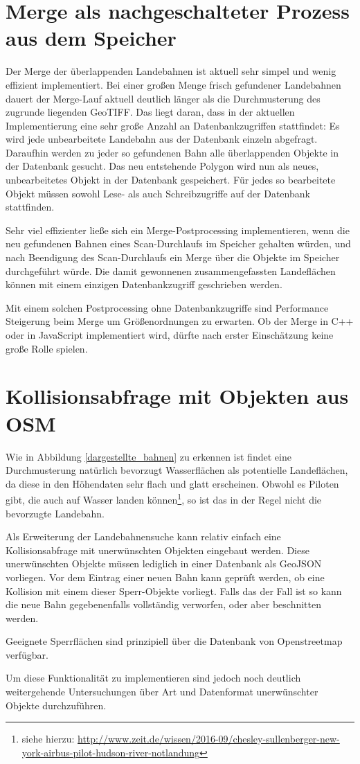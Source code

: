 \documentclass[10pt,a4paper]{report}
\begin{document}
\section{Merge als nachgeschalteter Prozess aus dem Speicher}
Der Merge der überlappenden Landebahnen ist aktuell sehr simpel und wenig effizient implementiert. Bei einer großen Menge frisch gefundener Landebahnen dauert der Merge-Lauf aktuell deutlich länger als die Durchmusterung des zugrunde liegenden GeoTIFF. Das liegt daran, dass in der aktuellen Implementierung eine sehr große Anzahl an Datenbankzugriffen stattfindet: Es wird jede unbearbeitete Landebahn aus der Datenbank einzeln abgefragt. Daraufhin werden zu jeder so gefundenen Bahn alle überlappenden Objekte in der Datenbank gesucht. Das neu entstehende Polygon wird nun als neues, unbearbeitetes Objekt in der Datenbank gespeichert. Für jedes so bearbeitete Objekt müssen sowohl Lese- als auch Schreibzugriffe auf der Datenbank stattfinden.

Sehr viel effizienter ließe sich ein Merge-Postprocessing implementieren, wenn die neu gefundenen Bahnen eines Scan-Durchlaufs im Speicher gehalten würden, und nach Beendigung des Scan-Durchlaufs ein Merge über die Objekte im Speicher durchgeführt würde. Die damit gewonnenen zusammengefassten Landeflächen können mit einem einzigen Datenbankzugriff geschrieben werden. 

Mit einem solchen Postprocessing ohne Datenbankzugriffe sind Performance Steigerung beim Merge um Größenordnungen zu erwarten.
Ob der Merge in C++ oder in JavaScript implementiert wird, dürfte nach erster Einschätzung keine große Rolle spielen.

\section{Kollisionsabfrage mit Objekten aus OSM}
Wie in Abbildung \ref{dargestellte_bahnen} zu erkennen ist findet eine Durchmusterung natürlich bevorzugt Wasserflächen als potentielle Landeflächen, da diese in den Höhendaten sehr flach und glatt erscheinen. Obwohl es Piloten gibt, die auch auf Wasser landen können\footnote{siehe hierzu: \href{http://www.zeit.de/wissen/2016-09/chesley-sullenberger-new-york-airbus-pilot-hudson-river-notlandung}{http://www.zeit.de/wissen/2016-09/chesley-sullenberger-new-york-airbus-pilot-hudson-river-notlandung}}, so ist das in der Regel nicht die bevorzugte Landebahn. 

Als Erweiterung der Landebahnensuche kann relativ einfach eine Kollisionsabfrage mit unerwünschten Objekten eingebaut werden. Diese unerwünschten Objekte müssen lediglich in einer Datenbank als GeoJSON vorliegen. Vor dem Eintrag einer neuen Bahn kann geprüft werden, ob eine Kollision mit einem dieser Sperr-Objekte vorliegt. Falls das der Fall ist so kann die neue Bahn gegebenenfalls vollständig verworfen, oder aber beschnitten werden.

Geeignete Sperrflächen sind prinzipiell über die Datenbank von Openstreetmap verfügbar. 

Um diese Funktionalität zu implementieren sind jedoch noch deutlich weitergehende Untersuchungen über Art und Datenformat unerwünschter Objekte durchzuführen.
\end{document}
